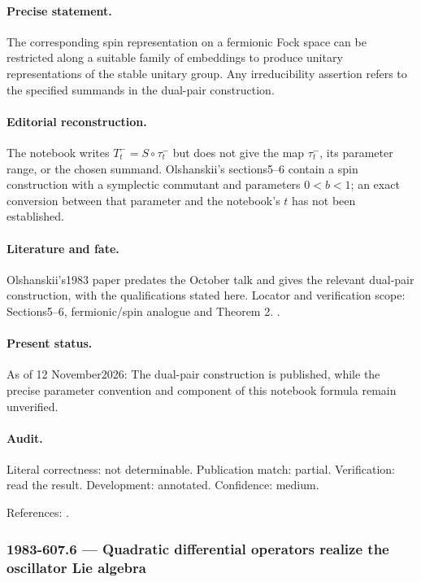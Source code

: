 \paragraph{Precise statement.} The corresponding spin representation on a fermionic Fock space can be restricted along a suitable family of embeddings to produce unitary representations of the stable unitary group. Any irreducibility assertion refers to the specified summands in the dual-pair construction.

\paragraph{Editorial reconstruction.} The notebook writes \(T_t^-=S\circ\tau_t^-\) but does not give the map \(\tau_t^-\), its parameter range, or the chosen summand. Olshanskii's sections5--6 contain a spin construction with a symplectic commutant and parameters \(0<b<1\); an exact conversion between that parameter and the notebook's \(t\) has not been established.

\paragraph{Literature and fate.} Olshanskii's1983 paper predates the October talk and gives the relevant dual-pair construction, with the qualifications stated here. Locator and verification scope: Sections5--6, fermionic/spin analogue and Theorem 2. \cite{olshanskii1983pairs}.

\paragraph{Present status.} As of 12 November2026: The dual-pair construction is published, while the precise parameter convention and component of this notebook formula remain unverified.

\paragraph{Audit.} Literal correctness: not determinable. Publication match: partial. Verification: read the result. Development: annotated. Confidence: medium.

\noindent References: \citep{olshanskii1983pairs}.\par

\subsubsection{1983-607.6 --- Quadratic differential operators realize the oscillator Lie algebra}

